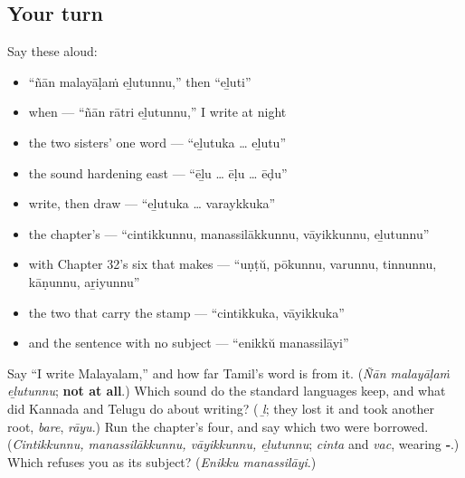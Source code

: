 \subsection*{Your turn}
Say these aloud:

\begin{itemize}
\raggedright
  \item \textquotedblleft{}ñān malayāḷaṁ eḻutunnu,\textquotedblright{} then \textquotedblleft{}eḻuti\textquotedblright{}
  \item when — \textquotedblleft{}ñān rātri eḻutunnu,\textquotedblright{} I write at night
  \item the two sisters' one word — \textquotedblleft{}eḻutuka … eḻutu\textquotedblright{}
  \item the sound hardening east — \textquotedblleft{}ēḻu … ēḷu … ēḍu\textquotedblright{}
  \item write, then draw — \textquotedblleft{}eḻutuka … varaykkuka\textquotedblright{}
  \item the chapter's \textbf{} — \textquotedblleft{}cintikkunnu, manassilākkunnu, vāyikkunnu, eḻutunnu\textquotedblright{}
  \item with Chapter 32's six that makes \textbf{} — \textquotedblleft{}uṇṭŭ, pōkunnu, varunnu, tinnunnu, kāṇunnu, aṟiyunnu\textquotedblright{}
  \item the two that carry the stamp — \textquotedblleft{}cintikkuka, vāyikkuka\textquotedblright{}
  \item and the sentence with no subject — \textquotedblleft{}enikkŭ manassilāyi\textquotedblright{}
\end{itemize}

\begin{tcolorbox}[breakable,colback=teal!4,colframe=teal!35!black,title={Before you move on}]
Say \textquotedblleft{}I write Malayalam,\textquotedblright{} and how far Tamil's word is from it. (\emph{Ñān malayāḷaṁ eḻutunnu}; \textbf{not at all}.) Which sound do the standard languages keep, and what did Kannada and Telugu do about writing? (\textbf{} \emph{ḻ}; they lost it and took another root, \emph{bare}, \emph{rāyu}.) Run the chapter's four, and say which two were borrowed. (\emph{Cintikkunnu, manassilākkunnu, vāyikkunnu, eḻutunnu}; \emph{cinta} and \emph{vac}, wearing \textbf{‑}.) Which refuses you as its subject? (\emph{Enikku manassilāyi}.)
\end{tcolorbox}
